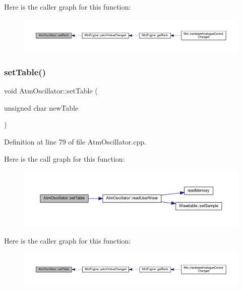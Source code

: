 Here is the caller graph for this function\+:
\nopagebreak
\begin{figure}[H]
\begin{center}
\leavevmode
\includegraphics[width=350pt]{class_atm_oscillator_a9f65ae9f2132c46f73b776a869b5bf21_icgraph}
\end{center}
\end{figure}
\mbox{\label{class_atm_oscillator_ac4248a3cd6fceea6ee677e74faba4af0}} 
\subsubsection{\texorpdfstring{set\+Table()}{setTable()}}
{\footnotesize\ttfamily void Atm\+Oscillator\+::set\+Table (\begin{DoxyParamCaption}\item[{unsigned char}]{new\+Table }\end{DoxyParamCaption})}



Definition at line 79 of file Atm\+Oscillator.\+cpp.

Here is the call graph for this function\+:
\nopagebreak
\begin{figure}[H]
\begin{center}
\leavevmode
\includegraphics[width=350pt]{class_atm_oscillator_ac4248a3cd6fceea6ee677e74faba4af0_cgraph}
\end{center}
\end{figure}
Here is the caller graph for this function\+:
\nopagebreak
\begin{figure}[H]
\begin{center}
\leavevmode
\includegraphics[width=350pt]{class_atm_oscillator_ac4248a3cd6fceea6ee677e74faba4af0_icgraph}
\end{center}
\end{figure}
\mbox{\label{class_atm_oscillator_aafaccbb54d52f2c0eb07eb968498eef4}} 
